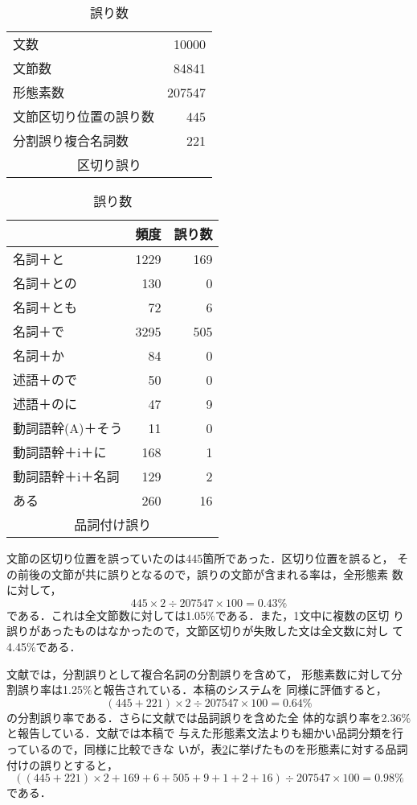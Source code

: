 \begin{table}
\begin{center}
\begin{minipage}[t]{6cm}
\begin{tabular}{|l|r|} \hline
文数 & 10000 \\
文節数 & 84841 \\
形態素数 & 207547 \\ \hline
文節区切り位置の誤り数 & 445 \\ \hline
分割誤り複合名詞数 & 221 \\ \hline
\multicolumn{2}{c}{区切り誤り}
\end{tabular}
\end{minipage}
\begin{minipage}[t]{5cm}
\begin{tabular}{|l|r|r|} \hline
& 頻度 & 誤り数 \\ \hline
名詞＋と   & 1229 & 169 \\
名詞＋との &  130 & 0 \\
名詞＋とも &   72 & 6 \\
名詞＋で   & 3295 & 505 \\
名詞＋か   &   84 & 0 \\
述語＋ので &   50 & 0 \\
述語＋のに &   47 & 9 \\
動詞語幹(A)＋そう & 11 & 0 \\
動詞語幹＋i＋に & 168 & 1 \\
動詞語幹＋i＋名詞 & 129 & 2 \\
ある & 260 & 16 \\ \hline
\multicolumn{3}{c}{品詞付け誤り}
\end{tabular}
\end{minipage}
\end{center}
\caption{誤り数}
\label{error}
\end{table}

文節の区切り位置を誤っていたのは445箇所であった．区切り位置を誤ると，
その前後の文節が共に誤りとなるので，誤りの文節が含まれる率は，全形態素
数に対して，
\[445 \times 2 \div 207547 \times 100 = 0.43\%\]
である．これは全文節数に対しては1.05\%である．また，1文中に複数の区切
り誤りがあったものはなかったので，文節区切りが失敗した文は全文数に対し
て4.45\%である．

文献\cite{maruyama94}では，分割誤りとして複合名詞の分割誤りを含めて，
形態素数に対して分割誤り率は1.25\%と報告されている．本稿のシステムを
同様に評価すると，
\[(445 + 221) \times 2 \div 207547 \times 100 = 0.64\%\]
の分割誤り率である．さらに文献\cite{maruyama94}では品詞誤りを含めた全
体的な誤り率を2.36\%と報告している．文献\cite{maruyama94}では本稿で
与えた形態素文法よりも細かい品詞分類を行っているので，同様に比較できな
いが，表\ref{error}に挙げたものを形態素に対する品詞付けの誤りとすると，
\[((445 + 221) \times 2+169+6+505+9+1+2+16) \div 207547 \times 100 = 0.98\%\]
である．

